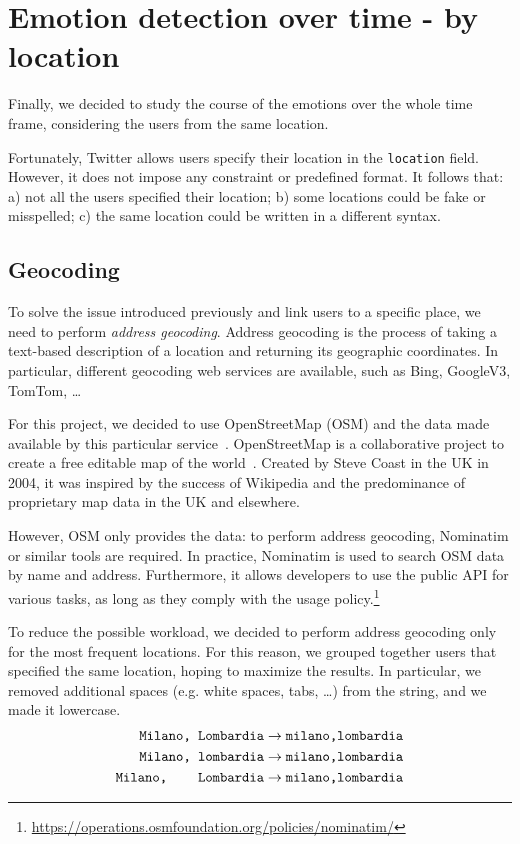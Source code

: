 \section{Emotion detection over time - by location}
\label{sec:emotion-by-location}

Finally, we decided to study the course of the emotions over the whole time frame, considering the users from the same location.

Fortunately, Twitter allows users specify their location in the \texttt{location} field. However, it does not impose any constraint or predefined format. It follows that: a) not all the users specified their location; b) some locations could be fake or misspelled; c) the same location could be written in a different syntax.

\subsection{Geocoding}
\label{subsec:geocoding}

To solve the issue introduced previously and link users to a specific place, we need to perform \textit{address geocoding}. Address geocoding is the process of taking a text-based description of a location and returning its geographic coordinates. In particular, different geocoding web services are available, such as Bing, GoogleV3, TomTom, \ldots

For this project, we decided to use OpenStreetMap (OSM) and the data made available by this particular service~\cite{osm}. OpenStreetMap is a collaborative project to create a free editable map of the world~\cite{enwiki:1028995235}. Created by Steve Coast in the UK in 2004, it was inspired by the success of Wikipedia and the predominance of proprietary map data in the UK and elsewhere.

However, OSM only provides the data: to perform address geocoding, Nominatim or similar tools are required. In practice, Nominatim is used to search OSM data by name and address. Furthermore, it allows developers to use the public API for various tasks, as long as they comply with the usage policy.\footnote{\url{https://operations.osmfoundation.org/policies/nominatim/}}

To reduce the possible workload, we decided to perform address geocoding only for the most frequent locations. For this reason, we grouped together users that specified the same location, hoping to maximize the results. In particular, we removed additional spaces (e.g. white spaces, tabs, \ldots) from the string, and we made it lowercase.
\begin{align*}
	\texttt{Milano, Lombardia} &\rightarrow \texttt{milano,lombardia} \\
	\texttt{Milano, lombardia} &\rightarrow \texttt{milano,lombardia} \\
	\texttt{Milano, \;\;\;\; Lombardia} &\rightarrow \texttt{milano,lombardia}
\end{align*}

